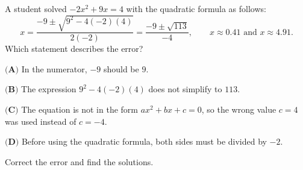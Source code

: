 A student solved $-2x^2+9x=4$ with the quadratic formula as follows:
\[x=\dfrac{-9\pm\sqrt{9^2-4(-2)(4)}}{2(-2)}=\dfrac{-9\pm\sqrt{113}}{-4},\qquad x\approx0.41\text{ and }x\approx4.91.\]
Which statement describes the error?

$\textbf{(A)}$ In the numerator, $-9$ should be $9$.

$\textbf{(B)}$ The expression $9^2-4(-2)(4)$ does not simplify to $113$.

$\textbf{(C)}$ The equation is not in the form $ax^2+bx+c=0$, so the wrong value $c=4$ was used instead of $c=-4$.

$\textbf{(D)}$ Before using the quadratic formula, both sides must be divided by $-2$.

Correct the error and find the solutions.
